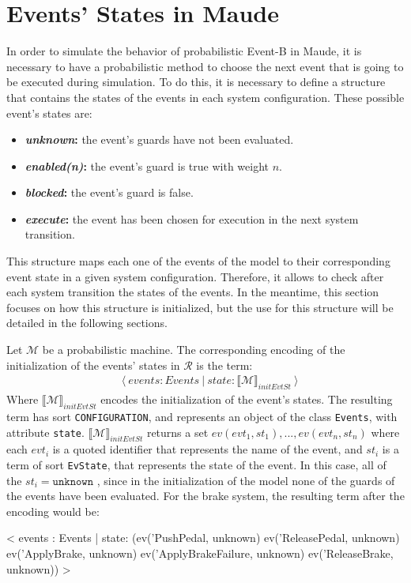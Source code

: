 \section{Events' States in Maude}
In order to simulate the behavior of probabilistic Event-B in Maude, it is necessary to have a probabilistic method to choose the next event that is going to be executed during simulation. To do this, it is necessary to define a structure that contains the states of the events in each system configuration. These possible event's states are:
\begin{itemize}
    \item \textbf{\textit{unknown}:} the event's guards have not been evaluated.
    \item \textbf{\textit{enabled(n)}:} the event's guard is true with weight $n$.
    \item \textbf{\textit{blocked}:} the event's guard is false.
    \item \textbf{\textit{execute}:} the event has been chosen for execution in the next system transition.
\end{itemize}
This structure maps each one of the events of the model to their corresponding event state in a given system configuration. Therefore, it allows to check after each system transition the states of the events. In the meantime, this section focuses on how this structure is initialized, but the use for this structure will be detailed in the following sections.

Let $\mathscr{M}$ be a probabilistic machine. The corresponding encoding of the initialization of the events' states in $\mathscr{R}$ is the term:
    \begin{align*}
    & \langle \ events : Events \ | \ state :  \llbracket \mathscr{M} \rrbracket_{initEvtSt}  \ \rangle
    \end{align*}
Where $\llbracket \mathscr{M} \rrbracket_{initEvtSt}$ encodes the initialization of the event's states. The resulting term has sort \texttt{CONFIGURATION}, and represents an object of the class \texttt{Events}, with attribute \texttt{state}. $\llbracket \mathscr{M} \rrbracket_{initEvtSt}$ returns a set $ev(evt_1,st_1), ..., ev(evt_n,st_n)$ where each $evt_i$ is a quoted identifier that represents the name of the event, and $st_i$ is a term of sort \texttt{EvState}, that represents the state of the event. In this case, all of the $st_i = \texttt{unknown}$ , since in the initialization of the model none of the guards of the events have been evaluated. For the brake system, the resulting term after the encoding would be:
\begin{maude}

< events : Events | state: (ev('PushPedal, unknown) 
                            ev('ReleasePedal, unknown) 
                            ev('ApplyBrake, unknown) 
                            ev('ApplyBrakeFailure, unknown) 
                            ev('ReleaseBrake, unknown)) >
\end{maude}

